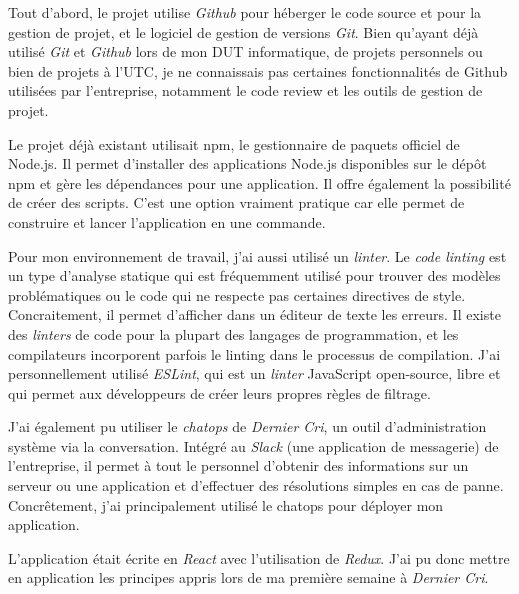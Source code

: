 \documentclass[12pt,a4paper]{article}
\begin{document}
  \bigskip

  Tout d'abord, le projet utilise \emph{Github} pour héberger le code
  source et pour la gestion de projet, et le logiciel de gestion de
  versions \emph{Git}. Bien qu'ayant déjà utilisé \emph{Git} et
  \emph{Github} lors de mon DUT informatique, de projets personnels ou
  bien de projets à l'UTC, je ne connaissais pas certaines fonctionnalités
  de Github utilisées par l'entreprise, notamment le code review et les
  outils de gestion de projet.

  \bigskip

  Le projet déjà existant utilisait npm, le gestionnaire de paquets
  officiel de Node.js. Il permet d'installer des applications Node.js
  disponibles sur le dépôt npm et gère les dépendances pour une
  application. Il offre également la possibilité de créer des scripts.
  C'est une option vraiment pratique car elle permet de construire et
  lancer l'application en une commande.

  \bigskip

  Pour mon environnement de travail, j'ai aussi utilisé un \emph{linter}.
  Le \emph{code linting} est un type d'analyse statique qui est
  fréquemment utilisé pour trouver des modèles problématiques ou le code
  qui ne respecte pas certaines directives de style. Concraitement, il
  permet d'afficher dans un éditeur de texte les erreurs. Il existe des
  \emph{linters} de code pour la plupart des langages de programmation, et
  les compilateurs incorporent parfois le linting dans le processus de
  compilation. J'ai personnellement utilisé \emph{ESLint}, qui est un
  \emph{linter} JavaScript open-source, libre et qui permet aux
  développeurs de créer leurs propres règles de filtrage.

  \bigskip

  J'ai également pu utiliser le \emph{chatops} de \emph{Dernier Cri}, un
  outil d'administration système via la conversation. Intégré au
  \emph{Slack} (une application de messagerie) de l'entreprise, il permet
  à tout le personnel d'obtenir des informations sur un serveur ou une
  application et d'effectuer des résolutions simples en cas de panne.
  Concrêtement, j'ai principalement utilisé le chatops pour déployer mon
  application.

  \bigskip

  L'application était écrite en \emph{React} avec l'utilisation de
  \emph{Redux}. J'ai pu donc mettre en application les principes appris
  lors de ma première semaine à \emph{Dernier Cri}.
\end{document}
